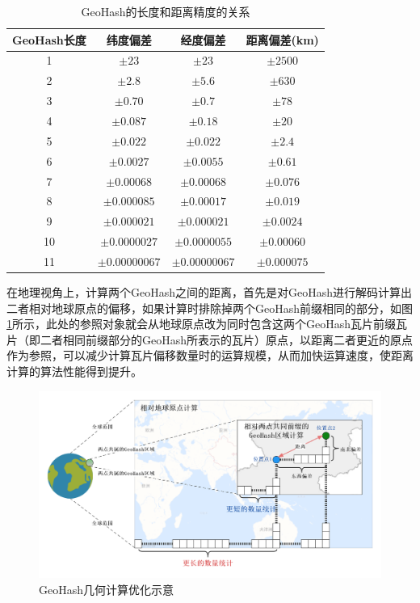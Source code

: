 \begin{table}
  \centering
  \caption{GeoHash的长度和距离精度的关系}\label{tab:GeoHashScale}
  \begin{tabular*}{0.9\textwidth}{@{\extracolsep{\fill}}cccc}
  \toprule
    GeoHash长度    &纬度偏差 &经度偏差 &距离偏差(km) \\
  \midrule
    1    &$\pm23$ &$\pm23$ &$\pm2500$\\
    2    &$\pm2.8$ &$\pm5.6$ &$\pm630$\\
    3    &$\pm0.70$ &$\pm0.7$ &$\pm78$\\
    4    &$\pm0.087$ &$\pm0.18$ &$\pm20$\\
    5    &$\pm0.022$ &$\pm0.022$ &$\pm2.4$\\
    6    &$\pm0.0027$ &$\pm0.0055$ &$\pm0.61$\\
    7    &$\pm0.00068$ &$\pm0.00068$ &$\pm0.076$\\
    8    &$\pm0.000085$ &$\pm0.00017$ &$\pm0.019$\\
    9    &$\pm0.000021$ &$\pm0.000021$ &$\pm0.0024$\\
    10    &$\pm0.0000027$ &$\pm0.0000055$ &$\pm0.00060$\\
    11    &$\pm0.00000067$ &$\pm0.00000067$ &$\pm0.000075$\\
  \bottomrule
  \end{tabular*}
\end{table}

在地理视角上，计算两个GeoHash之间的距离，首先是对GeoHash进行解码计算出二者相对地球原点的偏移，如果计算时排除掉两个GeoHash前缀相同的部分，如图\ref{fig:calBetter}所示，此处的参照对象就会从地球原点改为同时包含这两个GeoHash瓦片前缀瓦片（即二者相同前缀部分的GeoHash所表示的瓦片）原点，以距离二者更近的原点作为参照，可以减少计算瓦片偏移数量时的运算规模，从而加快运算速度，使距离计算的算法性能得到提升。

\begin{figure}
  \centering
  \includegraphics[width=1.0\textwidth]{figures/GeoHash计算优化}
  \caption{GeoHash几何计算优化示意}\label{fig:calBetter}
\end{figure}

